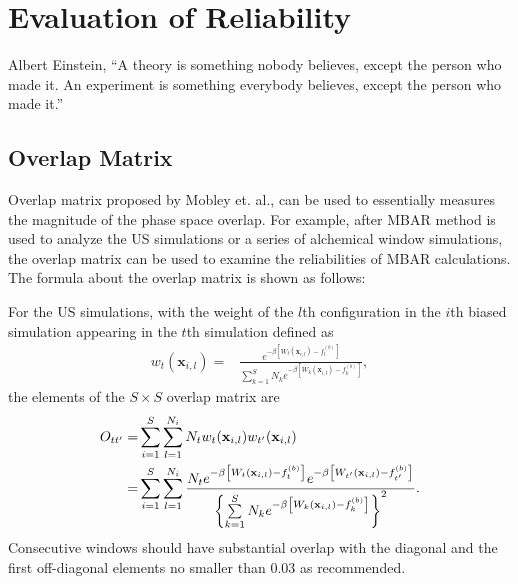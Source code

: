 \chapter{Evaluation of Reliability\label{chapter:Eva}}
\begin{chapquote}{Albert Einstein, %
	}
	``A theory is something nobody believes, except the person who made it. An experiment is something everybody believes, except the person who made it.''
\end{chapquote}
\section{Overlap Matrix\label{Sec:Eva:OM}}
Overlap matrix proposed by Mobley et. al.,\cite{KlimovichJCAMD2015} can be used to essentially measures the magnitude of the phase space overlap. For example, after MBAR method is used to analyze the US simulations or a series of alchemical window simulations, the overlap matrix can be used to examine the reliabilities of MBAR calculations. The formula about the overlap matrix is shown as follows:

For the US simulations, with the weight of the $l$th configuration in the $i$th biased simulation appearing in the $t$th simulation defined as
\begin{align}
	w_{t}(\textbf{x}_{i,l})
	=&\frac{e^{-\beta \left[W_{t}(\textbf{x}_{i,l})-f_{t}^{(b)}\right]}}{\sum\limits_{k=1}^{S}N_{k}e^{-\beta\left[W_{k}(\textbf{x}_{i,l})-f_{k}^{(b)}\right]}},
	\label{Eq:weight3} 
\end{align}
the elements of the $S \times S$ overlap matrix are\cite{KlimovichJCAMD2015}
\begin{align}
	O_{tt^{\prime}} =&\sum\limits_{i=1}^{S}\sum\limits_{l=1}^{N_{i}}N_tw_{t}(\textbf{x}_{i,l})w_{t^\prime}(\textbf{x}_{i,l})\notag\\
	=&
	\sum\limits_{i=1}^{S}\sum\limits_{l=1}^{N_{i}}
	\frac{N_{t}e^{-\beta\left[W_{t}(\textbf{x}_{i,l})-f_{t}^{(b)}\right]}e^{-\beta \left[W_{t^{\prime}}(\textbf{x}_{i,l})-f_{t^{\prime}}^{(b)}\right]}}{\left\{\sum\limits_{k=1}^{S}N_{k}e^{-\beta\left[W_{k}(\textbf{x}_{i,l})-f_{k}^{(b)}\right]}\right\}^2}.
	\label{Eq:OM}
\end{align}
Consecutive windows should have substantial overlap with the diagonal and the first off-diagonal elements no smaller than 0.03 as recommended\cite{KlimovichJCAMD2015}. 

